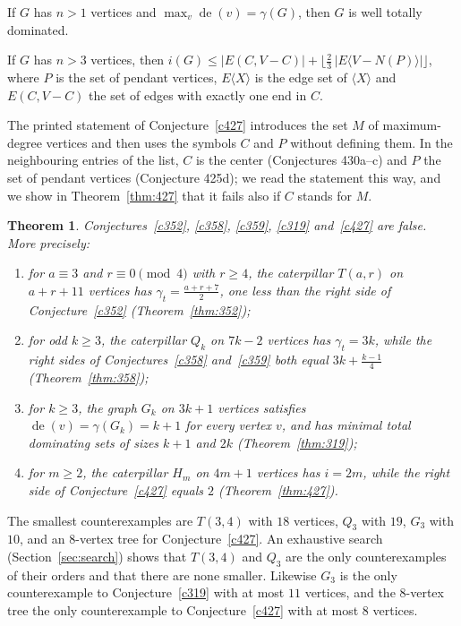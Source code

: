 \documentclass[11pt]{amsart}
\newtheorem{theorem}{Theorem}[section]
\theoremstyle{definition}
\newenvironment{conjecture}[1]{\renewcommand{\theinnerconj}{#1}\innerconj}{\endinnerconj}
\theoremstyle{remark}
\numberwithin{equation}{section}
\newcommand{\gt}{\gamma_t}
\newcommand{\de}{\operatorname{de}}
\begin{document}
\begin{conjecture}{319}\label{c319}
If $G$ has $n>1$ vertices and $\max_v\de(v)=\gamma(G)$, then $G$ is well totally dominated.
\end{conjecture}

\begin{conjecture}{427}\label{c427}
If $G$ has $n>3$ vertices, then $i(G)\le|E(C,V-C)|+\bigl\lfloor\tfrac23\,|E\langle V-N(P)\rangle|\bigr\rfloor$, where $P$ is the set of pendant vertices, $E\langle X\rangle$ is the edge set of $\langle X\rangle$ and $E(C,V-C)$ the set of edges with exactly one end in $C$.
\end{conjecture}

The printed statement of Conjecture~\ref{c427} introduces the set $M$ of maximum-degree vertices and then uses the symbols $C$ and $P$ without defining them. In the neighbouring entries of the list, $C$ is the center (Conjectures 430a--c) and $P$ the set of pendant vertices (Conjecture 425d); we read the statement this way, and we show in Theorem~\ref{thm:427} that it fails also if $C$ stands for $M$.

\begin{theorem}\label{thm:main}
Conjectures~\ref{c352}, \ref{c358}, \ref{c359}, \ref{c319} and~\ref{c427} are false. More precisely:
\begin{enumerate}
\item for $a\equiv 3$ and $r\equiv 0\pmod 4$ with $r\ge4$, the caterpillar $T(a,r)$ on $a+r+11$ vertices has $\gt=\frac{a+r+7}2$, one less than the right side of Conjecture~\ref{c352} (Theorem~\ref{thm:352});
\item for odd $k\ge3$, the caterpillar $Q_k$ on $7k-2$ vertices has $\gt=3k$, while the right sides of Conjectures~\ref{c358} and~\ref{c359} both equal $3k+\frac{k-1}4$ (Theorem~\ref{thm:358});
\item for $k\ge3$, the graph $G_k$ on $3k+1$ vertices satisfies $\de(v)=\gamma(G_k)=k+1$ for every vertex $v$, and has minimal total dominating sets of sizes $k+1$ and $2k$ (Theorem~\ref{thm:319});
\item for $m\ge2$, the caterpillar $H_m$ on $4m+1$ vertices has $i=2m$, while the right side of Conjecture~\ref{c427} equals $2$ (Theorem~\ref{thm:427}).
\end{enumerate}
\end{theorem}

The smallest counterexamples are $T(3,4)$ with $18$ vertices, $Q_3$ with $19$, $G_3$ with $10$, and an $8$-vertex tree for Conjecture~\ref{c427}. An exhaustive search (Section~\ref{sec:search}) shows that $T(3,4)$ and $Q_3$ are the only counterexamples of their orders and that there are none smaller. Likewise $G_3$ is the only counterexample to Conjecture~\ref{c319} with at most $11$ vertices, and the $8$-vertex tree the only counterexample to Conjecture~\ref{c427} with at most $8$ vertices.
\end{document}
